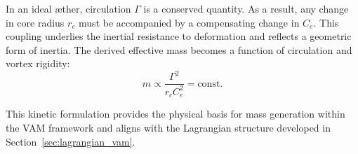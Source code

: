 In an ideal æther, circulation $\Gamma$ is a conserved quantity. As a result, any change in core radius $r_c$ must be accompanied by a compensating change in $C_e$. This coupling underlies the inertial resistance to deformation and reflects a geometric form of inertia. The derived effective mass becomes a function of circulation and vortex rigidity:
\[
    m \propto \frac{\Gamma^2}{r_c C_e^2} = \text{const.}
\]

This kinetic formulation provides the physical basis for mass generation within the VAM framework and aligns with the Lagrangian structure developed in Section~\ref{sec:lagrangian_vam}.
